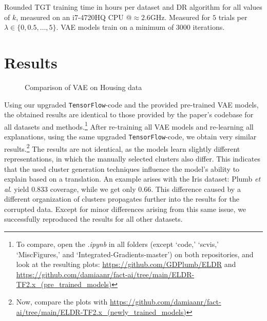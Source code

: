 \begin{table}[h]
  \centering
  
  \caption{Rounded TGT training time in hours per dataset and DR algorithm for all values of $k$, measured on an i7-4720HQ CPU @$\approx2.6$GHz. Measured for $5$ trials per $\lambda \in \{0, 0.5,  \ldots , 5\}$. VAE models train on a minimum of 3000 iterations.}
\end{table}

\section{Results}
\begin{figure}
  \caption{Comparison of VAE on Housing data}
\end{figure}

Using our upgraded \texttt{TensorFlow}-code and the provided pre-trained VAE models, the obtained results are identical to those provided by the paper's codebase for all datasets and methods.\footnote{To compare, open the \textit{.ipynb} in all folders (except `code,' `scvis,' `MiscFigures,' and `Integrated-Gradients-master') on both repositories, and look at the resulting plots: \url{https://github.com/GDPlumb/ELDR} and \url{https://github.com/damiaanr/fact-ai/tree/main/ELDR-TF2.x_(pre_trained_models)}} After re-training all VAE models and re-learning all explanations, using the same upgraded \texttt{TensorFlow}-code, we obtain very similar results.\footnote{Now, compare the plots with \url{https://github.com/damiaanr/fact-ai/tree/main/ELDR-TF2.x_(newly_trained_models)}} The results are not identical, as the models learn slightly different representations, in which the manually selected clusters also differ. This indicates that the used cluster generation techniques influence the model's ability to explain based on a translation. An example arises with the Iris dataset: Plumb \textit{et al}. yield $0.833$ coverage, while we get only $0.66$. This difference caused by a different organization of clusters propagates further into the results for the corrupted data. Except for minor differences arising from this same issue, we successfully reproduced the results for all other datasets.\\

